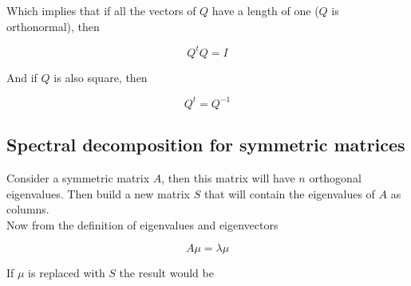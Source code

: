 \documentclass[12pt,journal]{IEEEtran}
\begin{document}
    Which implies that if all the vectors of $Q$ have a length of one ($Q$ is
    orthonormal), then

    \begin{equation*}
        Q^t Q = I
    \end{equation*}

    And if $Q$ is also square, then

    \begin{equation*}
        Q^t = Q^{-1}
    \end{equation*}

    \subsection{Spectral decomposition for symmetric matrices} \label{spectral_decomp}

    Consider a symmetric matrix $A$, then this matrix will have $n$ orthogonal
    eigenvalues. Then build a new matrix $S$ that will contain the eigenvalues of
    $A$ as columns.\\

    Now from the definition of eigenvalues and eigenvectors

    \begin{equation*}
        A \mu = \lambda \mu
    \end{equation*}

    If $\mu$ is replaced with $S$ the result would be
\end{document}
